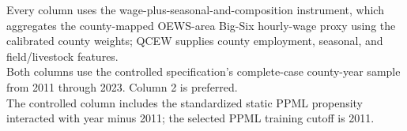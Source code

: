 \begin{table}[htbp]
   \par \raggedright
   Every column uses the wage-plus-seasonal-and-composition instrument, which aggregates the county-mapped OEWS-area Big-Six hourly-wage proxy using the calibrated county weights; QCEW supplies county employment, seasonal, and field/livestock features.\\
   Both columns use the controlled specification's complete-case county-year sample from 2011 through 2023. Column 2 is preferred.\\
   The controlled column includes the standardized static PPML propensity interacted with year minus 2011; the selected PPML training cutoff is 2011.
\end{table}


